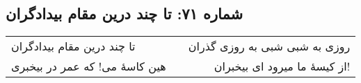 \begin{center}
\section*{شماره ۷۱: تا چند درین مقام بیدادگران}
\label{sec:071}
\begin{longtable}{l p{0.5cm} r}
تا چند درین مقام بیدادگران
&&
روزی به شبی شبی به روزی گذران
\\
هین کاسهٔ می! که عمر در بیخبری
&&
از کیسهٔ ما میرود ای بیخبران!
\\
\end{longtable}
\end{center}
